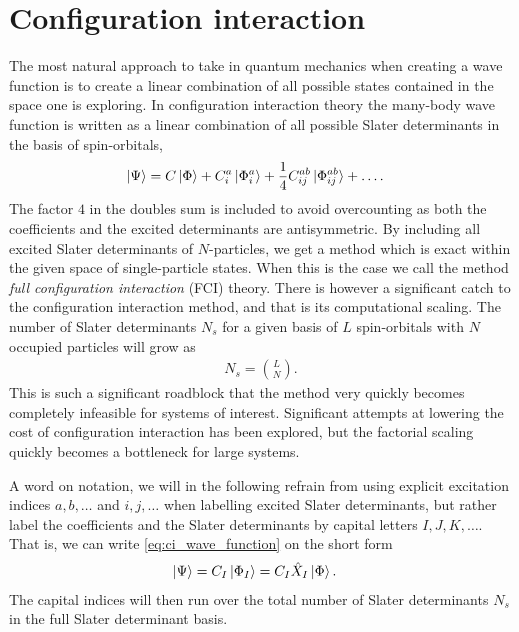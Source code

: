 \chapter{Configuration interaction}
    \label{chap:ci}
    The most natural approach to take in quantum mechanics when creating a wave
    function is to create a linear combination of all possible states contained
    in the space one is exploring.
    In configuration interaction theory the many-body wave function is written
    as a linear combination of all possible Slater determinants in the basis of
    spin-orbitals,
    \begin{align}
        \ket*{\Psi}
        &= C\ket*{\Phi}
        + C^a_i\ket*{\Phi^{a}_{i}}
        + \frac{1}{4}C^{ab}_{ij}\ket*{\Phi^{ab}_{ij}}
        + \dots.
        \label{eq:ci_wave_function}
    \end{align}
    The factor $4$ in the doubles sum is included to avoid overcounting as both
    the coefficients and the excited determinants are antisymmetric.
    By including all excited Slater determinants of $N$-particles, we get a
    method which is exact within the given space of single-particle states.
    When this is the case we call the method \emph{full configuration
    interaction} (FCI) theory.
    There is however a significant catch to the configuration interaction
    method, and that is its computational scaling.
    The number of Slater determinants $N_{s}$ for a given basis of $L$
    spin-orbitals with $N$ occupied particles will grow as \cite{kvaal2017notes}
    \begin{align}
        N_{s} = \binom{L}{N}.
    \end{align}
    This is such a significant roadblock that the method very quickly becomes
    completely infeasible for systems of interest.
    Significant attempts at lowering the cost of configuration interaction has
    been explored, but the factorial scaling quickly becomes a bottleneck for
    large systems.

    A word on notation, we will in the following refrain from using explicit
    excitation indices $a, b, \dots$ and $i, j, \dots$ when labelling excited
    Slater determinants, but rather label the coefficients and the Slater
    determinants by capital letters $I, J, K, \dots$.
    That is, we can write \autoref{eq:ci_wave_function} on the short form
    \begin{align}
        \ket*{\Psi}
        &= C_{I}\ket*{\Phi_I}
        = C_{I}\hat{X}_I\ket*{\Phi}.
    \end{align}
    The capital indices will then run over the total number of Slater
    determinants $N_s$ in the full Slater determinant basis.

